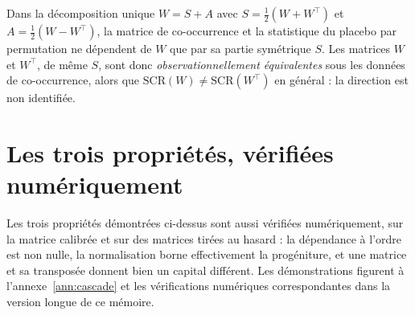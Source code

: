 \begin{proposition}
\label{prop:nonid}
Dans la décomposition unique $W=S+A$ avec $S=\tfrac12(W+W^\top)$ et $A=\tfrac12(W-W^\top)$,
la matrice de co-occurrence et la statistique du placebo par permutation ne dépendent de $W$
que par sa partie symétrique $S$. Les matrices $W$ et $W^\top$, de même $S$, sont donc
\emph{observationnellement équivalentes} sous les données de co-occurrence, alors que
$\mathrm{SCR}(W)\neq\mathrm{SCR}(W^\top)$ en général : la direction est non identifiée.
\end{proposition}


\section{Les trois propriétés, vérifiées numériquement}
\label{sec:verif-proprietes}
Les trois propriétés démontrées ci-dessus sont aussi vérifiées numériquement, sur la
matrice calibrée et sur des matrices tirées au hasard : la dépendance à l'ordre est non
nulle, la normalisation borne effectivement la progéniture, et une matrice et sa
transposée donnent bien un capital différent. Les démonstrations figurent à
l'annexe~\ref{ann:cascade} et les vérifications numériques correspondantes dans la version longue de ce mémoire.

